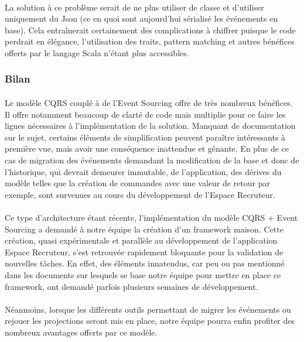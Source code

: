 \paragraph{}
La solution à ce problème serait de ne plus utiliser de classe et d'utiliser uniquement du Json (ce en quoi sont aujourd'hui sérialisé les événements en base).
Cela entraînerait certainement des complications à chiffrer puisque le code perdrait en élégance, l'utilisation des traits, pattern matching et autres bénéfices offerts par le langage Scala n'étant plus accessibles.
\subsubsection{Bilan}
\paragraph{}
Le modèle CQRS couplé à de l'Event Sourcing offre de très nombreux bénéfices.
Il offre notamment beaucoup de clarté de code mais multiplie pour ce faire les lignes nécessaires à l'implémentation de la solution.
Manquant de documentation sur le sujet, certains éléments de simplification peuvent paraître intéressants à première vue, mais avoir une conséquence inattendue et gênante.
En plus de ce cas de migration des événements demandant la modification de la base et donc de l'historique, qui devrait demeurer immutable, de l'application, des dérives du modèle telles que la création de commandes avec une valeur de retour par exemple, sont survenues au cours du développement de l'Espace Recruteur.
\paragraph{}
Ce type d'architecture étant récente, l'implémentation du modèle CQRS + Event Sourcing a demandé à notre équipe la création d'un framework maison.
Cette création, quasi expérimentale et parallèle au développement de l'application Espace Recruteur, s'est retrouvée rapidement bloquante pour la validation de nouvelles tâches.
En effet, des éléments innatendus, car peu ou pas mentionné dans les documents sur lesquels se base notre équipe pour mettre en place ce framework, ont demandé parfois plusieurs semaines de développement.
\paragraph{}
Néanmoins, lorsque les différents outils permettant de migrer les événements ou rejouer les projections seront mis en place, notre équipe pourra enfin profiter des nombreux avantages offerts par ce modèle.

